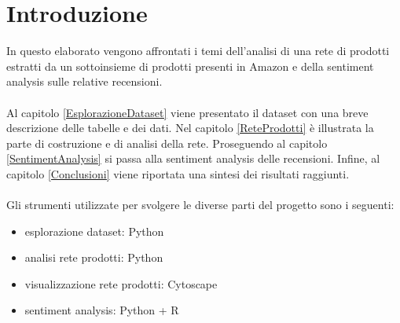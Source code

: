\section{Introduzione}
In questo elaborato vengono affrontati i temi dell'analisi di una rete di prodotti estratti da un sottoinsieme di prodotti presenti in Amazon e della sentiment analysis sulle relative recensioni.
\\\\
Al capitolo \ref{EsplorazioneDataset} viene presentato il dataset con una breve descrizione delle tabelle e dei dati. Nel capitolo \ref{ReteProdotti} è illustrata la parte di costruzione e di analisi della rete. Proseguendo al capitolo \ref{SentimentAnalysis} si passa alla sentiment analysis delle recensioni. Infine, al capitolo \ref{Conclusioni} viene riportata una sintesi dei risultati raggiunti.
\\\\
Gli strumenti utilizzate per svolgere le diverse parti del progetto sono i seguenti:
\begin{itemize}
    \item esplorazione dataset: Python
    \item analisi rete prodotti: Python
    \item visualizzazione rete prodotti: Cytoscape
    \item sentiment analysis: Python + R
\end{itemize}